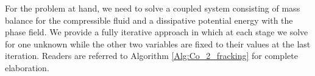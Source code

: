 For the problem at hand, we need to solve a coupled system consisting of mass balance for the compressible fluid and a dissipative potential energy with the phase field. We provide a fully iterative approach in which at each stage we solve for one unknown while the other two variables are fixed to their values at the last iteration. Readers are referred to Algorithm \ref{Alg:Co_2_fracking} for complete elaboration.

%	
%	
%	
%		
%				
%				
%				
%				
%						
%						
%						
%						
%				
%				
%		
%	

